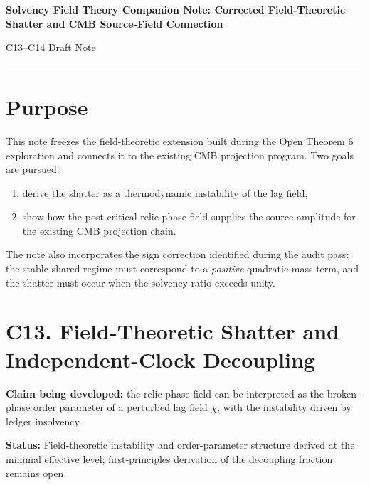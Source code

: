 \documentclass[11pt]{article}
\newcommand{\status}[1]{\textcolor{accent}{\textbf{Status:}} #1}
\begin{document}
{\Large\bfseries Solvency Field Theory Companion Note: Corrected Field-Theoretic Shatter and CMB Source-Field Connection\par}
\vspace{0.35em}
{\large C13--C14 Draft Note\par}
\vspace{0.5em}
\textcolor{accent}{\rule{\textwidth}{1pt}}

\section*{Purpose}
This note freezes the field-theoretic extension built during the Open Theorem 6 exploration and connects it to the existing CMB projection program. Two goals are pursued:
\begin{enumerate}[leftmargin=1.6em]
  \item derive the shatter as a thermodynamic instability of the lag field,
  \item show how the post-critical relic phase field supplies the source amplitude for the existing CMB projection chain.
\end{enumerate}
The note also incorporates the sign correction identified during the audit pass: the stable shared regime must correspond to a \emph{positive} quadratic mass term, and the shatter must occur when the solvency ratio exceeds unity.

\section*{C13. Field-Theoretic Shatter and Independent-Clock Decoupling}
\textcolor{accent}{\textbf{Claim being developed:}} the relic phase field can be interpreted as the broken-phase order parameter of a perturbed lag field $\chi$, with the instability driven by ledger insolvency.

\status{Field-theoretic instability and order-parameter structure derived at the minimal effective level; first-principles derivation of the decoupling fraction remains open.}
\end{document}
